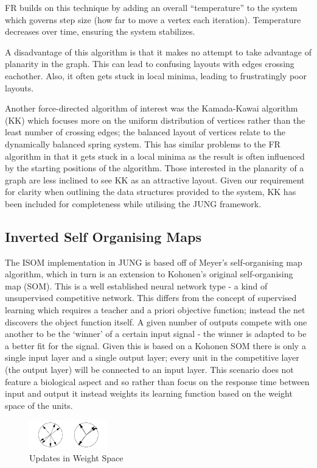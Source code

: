 \documentclass[11pt, a4paper]{report}
\begin{document}
FR builds on this technique by adding an overall “temperature” to the system which governs step size (how far to move a vertex each iteration). Temperature decreases over time, ensuring the system stabilizes.

A disadvantage of this algorithm is that it makes no attempt to take advantage of planarity in the graph. This can lead to confusing layouts with edges crossing eachother. Also, it often gets stuck in local minima, leading to frustratingly poor layouts.

Another force-directed algorithm of interest was the Kamada-Kawai algorithm (KK) which focuses more on the uniform distribution of vertices rather than the least number of crossing edges; the balanced layout of vertices relate to the dynamically balanced spring system. This has similar problems to the FR algorithm in that it gets stuck in a local minima as the result is often influenced by the starting positions of the algorithm. Those interested in the planarity of a graph are less inclined to see KK as an attractive layout. Given our requirement for clarity when outlining the data structures provided to the system, KK has been included for completeness while utilising the JUNG framework. 

\subsection{Inverted Self Organising Maps}

The ISOM implementation in JUNG is based off of Meyer’s self-organising map algorithm, which in turn is an extension to Kohonen’s original self-organising map (SOM). This is a well established neural network type - a kind of unsupervised competitive network. This differs from the concept of supervised learning which requires a teacher and a priori objective function; instead the net discovers the object function itself. A given number of outputs compete with one another to be the ‘winner’ of a certain input signal - the winner is adapted to be a better fit for the signal. Given this is based on a Kohonen SOM there is only a single input layer and a single output layer; every unit in the competitive layer (the output layer) will be connected to an input layer. This scenario does not feature a biological aspect and so rather than focus on the response time between input and output it instead weights its learning function based on the weight space of the units.

\begin{figure}[h]
        \centering
        \includegraphics[width=0.3\textwidth]{images/final/weight.png}
        \caption{Updates in Weight Space}
\end{figure}
\end{document}

